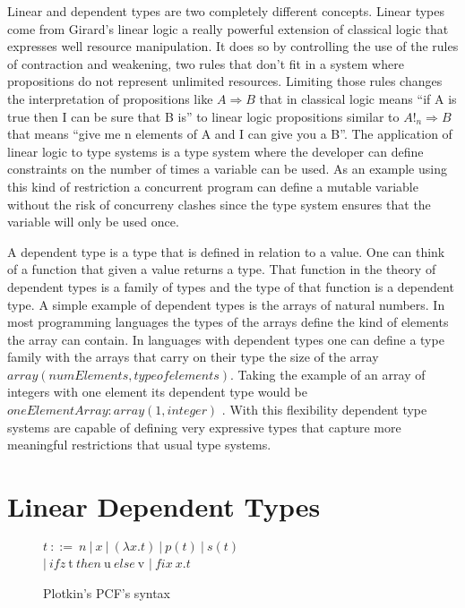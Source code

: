 \documentclass[a4paper,12pt]{article}
\begin{document}
Linear and dependent types are two completely different
concepts. Linear types come from Girard's linear logic
\cite{girard1987linear} a really powerful extension of classical logic
that expresses well resource manipulation. It does so by controlling
the use of the rules of contraction and weakening, two rules that
don't fit in a system where propositions do not represent unlimited
resources. Limiting those rules changes the interpretation of
propositions like $A \Rightarrow B$ that in classical logic means
``if A is true then I can be sure that B is'' to linear logic
propositions similar to $A!_n \Rightarrow B$ that means ``give me n
elements of A and I can give you a B''. The application of linear logic to type
systems is a type system where the developer can define constraints on the
number of times a variable can be used. As an example using this kind of
restriction a concurrent program can define a mutable variable without
the risk of concurreny clashes since the type system ensures that the variable
will only be used once.

A dependent type is a type that is defined in relation to a value. One can think
of a function that given a value returns a type. That function in the theory of
dependent types is a family of types and the type of that function is a
dependent type. A simple example of dependent types is the arrays of natural
numbers. In most programming languages the types of the arrays define the kind
of elements the array can contain. In languages with dependent types one can
define a type family with the arrays that carry on their type the size of the
array $array(numElements, typeofelements)$. Taking the example of an array of
integers with one element its dependent type would be $oneElementArray:array(1,
integer)$ . With this flexibility dependent type systems are capable of defining
very expressive types that capture more meaningful restrictions that usual type
systems.


\section{Linear Dependent Types}

\begin{figure}
  \begin{center}
    $t~::=~n~|~x~|~(\lambda x.t)~|~p(t)~|~s(t)$ \\
    $|~ifz~$t$~then~$u$~else~$v $|~fix~x.t$
  \end{center}
  \caption{Plotkin's PCF's syntax}
  \label{pcf-syntax}
\end{figure}
\end{document}
